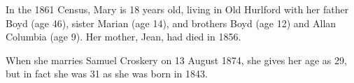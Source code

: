 
In the 1861 Census, Mary is 18 years old, living in Old Hurlford with her father Boyd (age 46), sister Marian (age 14), and brothers Boyd (age 12) and Allan Columbia (age 9). Her mother, Jean, had died in 1856.

When she marries Samuel Croskery on 13 August 1874, she gives her age as 29,\cite{SMWC-MG-marriage} but in fact she was 31 as she was born in 1843. 
